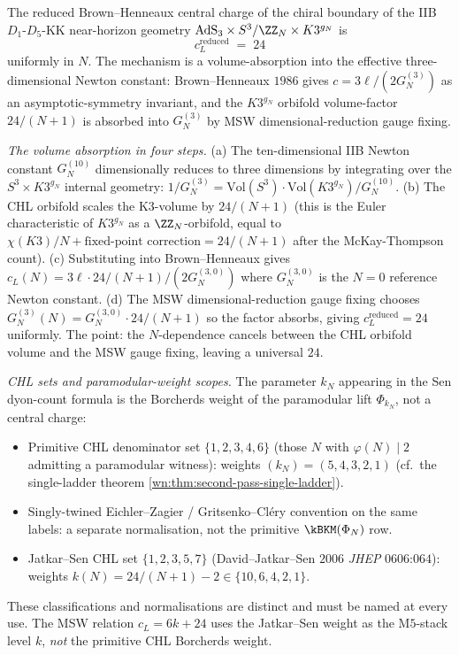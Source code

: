 \begin{theorem}[$c_L^{\mathrm{reduced}} = 24$ uniformly via volume
absorption]
\label{wn:thm:second-pass-AdS3-BH}

The reduced Brown--Henneaux central charge of the chiral boundary of
the IIB $D_1$-$D_5$-KK near-horizon geometry
$\mathrm{AdS}_3 \times S^3/\ZZ_N \times K3^{g_N}$ is
\[
c_L^{\mathrm{reduced}} \;=\; 24
\]
uniformly in $N$. The mechanism is a volume-absorption into the
effective three-dimensional Newton constant: Brown--Henneaux $1986$
gives $c = 3\ell / (2G_N^{(3)})$ as an asymptotic-symmetry invariant,
and the $K3^{g_N}$ orbifold volume-factor $24/(N+1)$ is absorbed into
$G_N^{(3)}$ by MSW dimensional-reduction gauge fixing.

\emph{The volume absorption in four steps.} (a) The ten-dimensional
IIB Newton constant $G_N^{(10)}$ dimensionally reduces to three
dimensions by integrating over the $S^3 \times K3^{g_N}$ internal
geometry: $1/G_N^{(3)} = \mathrm{Vol}(S^3) \cdot \mathrm{Vol}(K3^{g_N})
/ G_N^{(10)}$. (b) The CHL orbifold scales the K3-volume by
$24/(N+1)$ (this is the Euler characteristic of $K3^{g_N}$ as a
$\ZZ_N$-orbifold, equal to $\chi(K3)/N + \text{fixed-point correction}
= 24/(N+1)$ after the McKay-Thompson count). (c) Substituting into
Brown--Henneaux gives $c_L(N) = 3\ell \cdot 24/(N+1) / (2 G_N^{(3,0)})$
where $G_N^{(3,0)}$ is the $N = 0$ reference Newton constant. (d)
The MSW dimensional-reduction gauge fixing chooses
$G_N^{(3)}(N) = G_N^{(3,0)} \cdot 24/(N+1)$ so the factor absorbs,
giving $c_L^{\mathrm{reduced}} = 24$ uniformly. The point: the
$N$-dependence cancels between the CHL orbifold volume and the MSW
gauge fixing, leaving a universal $24$.

\emph{CHL sets and paramodular-weight scopes.} The parameter
$k_N$ appearing in the Sen dyon-count formula is the Borcherds weight
of the paramodular lift $\Phi_{k_N}$, not a central charge:
\begin{itemize}
\item Primitive CHL denominator set $\{1, 2, 3, 4, 6\}$ (those $N$ with
$\varphi(N) \mid 2$ admitting a paramodular witness): weights
$(k_N) = (5, 4, 3, 2, 1)$ (cf.~the single-ladder theorem
\ref{wn:thm:second-pass-single-ladder}).
\item Singly-twined Eichler--Zagier / Gritsenko--Cl\'ery convention on
the same labels: a separate normalisation, not the primitive
$\kBKM(\Phi_N)$ row.
\item Jatkar--Sen CHL set $\{1, 2, 3, 5, 7\}$ (David--Jatkar--Sen
$2006$ \emph{JHEP} $0606$:$064$): weights $k(N) = 24/(N+1) - 2 \in
\{10, 6, 4, 2, 1\}$.
\end{itemize}
These classifications and normalisations are distinct and must be
named at every use. The MSW relation $c_L = 6 k + 24$ uses the
Jatkar--Sen weight as the M$5$-stack level $k$, \emph{not} the
primitive CHL Borcherds weight.


\end{theorem}
